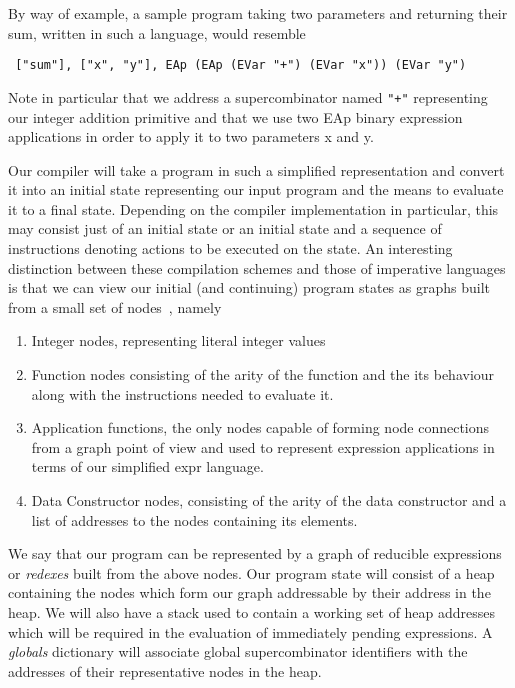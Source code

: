 \noindent By way of example, a sample program taking two parameters and returning
their sum, written in such a language, would resemble

\begin{verbatim}
 ["sum"], ["x", "y"], EAp (EAp (EVar "+") (EVar "x")) (EVar "y")
\end{verbatim}

\noindent Note in particular that we address a supercombinator named \verb!"+"!
representing our integer addition primitive and that we use two EAp 
binary expression applications in order to apply it to two parameters x and y.

Our compiler will take a program in such a simplified representation
and convert it into an initial state representing our input program and the
means to evaluate it to a final state. Depending on the compiler implementation
in particular, this may consist just of an initial state or an initial state
and a sequence of instructions denoting actions to be executed on the state. 
An interesting 
distinction between these compilation schemes and those of imperative languages
is that we can view our initial (and continuing) program states as graphs built
from a small set of nodes~\cite[pp.185]{SPJ}, namely

\begin{enumerate}
	\item Integer nodes, representing literal integer values
	\item Function nodes consisting of the arity of the function and the
		  its behaviour along with the instructions needed to evaluate it.
	\item Application functions, the only nodes capable of forming 
		  node connections from a graph point of view and used to represent
		  expression applications in terms of our simplified expr language.
	\item Data Constructor nodes, consisting of the arity of the data
		  constructor and a list of addresses to the nodes containing its
		  elements.
\end{enumerate}

We say that our program can be represented by a graph of reducible expressions
or \emph{redexes} built from the above nodes. 
Our program state will consist of a heap containing the nodes which form
our graph addressable by their address in the heap. We will
also have a stack used to contain a working set of heap addresses which 
will be required in the evaluation of immediately pending expressions. A 
\emph{globals} dictionary will associate global supercombinator identifiers with the
addresses of their representative nodes in the heap. \\

